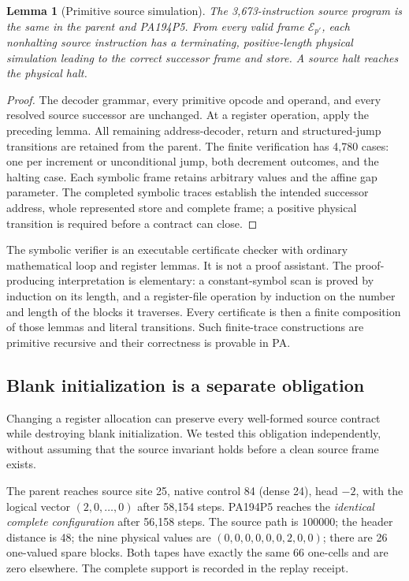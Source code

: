 \documentclass[11pt,letterpaper]{article}
\newtheorem{lemma}[theorem]{Lemma}
\begin{document}
\begin{lemma}[Primitive source simulation]
The 3,673-instruction source program is the same in the parent
and PA194P5. From every valid frame $\mathcal E_{p'}$, each
nonhalting source instruction has a terminating, positive-length
physical simulation leading to the correct successor frame and
store. A source halt reaches the physical halt.
\end{lemma}
\begin{proof}
The decoder grammar, every primitive opcode and operand, and every
resolved source successor are unchanged. At a register operation,
apply the preceding lemma. All remaining address-decoder, return
and structured-jump transitions are retained from the parent.
The finite verification has 4,780 cases: one per increment or
unconditional jump, both decrement outcomes, and the halting case.
Each symbolic frame retains arbitrary values and the affine gap
parameter. The completed symbolic traces establish the intended
successor address, whole represented store and complete frame;
a positive physical transition is required before a contract
can close.
\end{proof}

The symbolic verifier is an executable certificate checker with
ordinary mathematical loop and register lemmas. It is not a
proof assistant. The proof-producing interpretation is elementary:
a constant-symbol scan is proved by induction on its length,
and a register-file operation by induction on the number and
length of the blocks it traverses. Every certificate is then a
finite composition of those lemmas and literal transitions.
Such finite-trace constructions are primitive recursive and
their correctness is provable in PA.

\subsection{Blank initialization is a separate obligation}

Changing a register allocation can preserve every well-formed
source contract while destroying blank initialization. We tested
this obligation independently, without assuming that the source
invariant holds before a clean source frame exists.

The parent reaches source site 25, native control 84 (dense 24),
head $-2$, with the logical vector $(2,0,\ldots,0)$ after
58,154 steps. PA194P5 reaches the \emph{identical complete
configuration} after 56,158 steps. The source path is $100000$;
the header distance is 48; the nine physical values are
$(0,0,0,0,0,0,2,0,0)$; there are 26 one-valued spare blocks.
Both tapes have exactly the same 66 one-cells and are zero
elsewhere. The complete support is recorded in the replay receipt.
\end{document}
